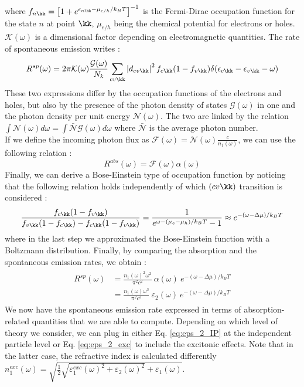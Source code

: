 where $f_{n\kk} = \left[ 1 + e^{\epsilon_{n\kk} - \mu_{e/h}/k_BT} \right]^{-1}$ is the Fermi-Dirac occupation function for the state $n$ at point $\kk$, $\mu_{e/h}$ being the chemical potential for electrons or holes. $\mathcal{K}(\omega)$ is a dimensional factor depending on electromagnetic quantities. The rate of spontaneous emission writes : 
\begin{equation}
	R^{sp}(\omega) = 2\pi \mathcal{K}(\omega) \frac{\mathcal{G} (\omega)}{N_k} \sum_{cv\kk} \left|d_{cv\kk} \right|^2 f_{c\kk}(1-f_{v\kk}) \delta(\epsilon_{c\kk} - \epsilon_{v\kk} - \omega)
\end{equation}
These two expressions differ by the occupation functions of the electrons and holes, but also by the presence of the photon density of states $\mathcal{G}(\omega)$ in one and the photon density per unit energy $\mathcal{N}(\omega)$. The two are linked by the relation $ \int\mathcal{N}(\omega) d\omega = \int \bar{\mathcal{N}} \mathcal{G}(\omega) d\omega$ where $\bar{\mathcal{N}}$ is the average photon number. \\
If we define the incoming photon flux as $\mathcal{F}(\omega) = \mathcal{N}(\omega) \frac{c}{n_1(\omega)}$, we can use the following relation :
\begin{equation}
	R^{abs}(\omega) = \mathcal{F}(\omega) \alpha(\omega)
\end{equation}
Finally, we can derive a Bose-Einstein type of occupation function by noticing that the following relation holds independently of which $(cv\kk)$ transition is considered :
\begin{equation}
	\frac{f_{c\kk} (1-f_{v\kk})}{f_{v\kk} (1-f_{c\kk}) - f_{c\kk}(1-f_{v\kk})} = \frac{1}{e^{\omega - (\mu_e - \mu_h)/k_BT} - 1 }\approx e^{-(\omega - \Delta \mu)/k_BT}
\end{equation}
where in the last step we approximated the Bose-Einstein function with a Boltzmann distribution.
Finally, by comparing the absorption and the spontaneous emission rates, we obtain :
\begin{align}
\begin{split}
	R^{sp}(\omega) &= \frac{n_1(\omega)^2\omega^2}{\pi^2 c^2}\ \alpha(\omega)\ e^{-(\omega - \Delta \mu)/k_BT} \\
	 &= \frac{n_1(\omega)\omega^3}{\pi^2 c^3}\ \varepsilon_2(\omega)\ e^{-(\omega - \Delta \mu)/k_BT} \label{eq:vRS_PL}
\end{split}
\end{align}
We now have the spontaneous emission rate expressed in terms of absorption-related quantities that we are able to compute. Depending on which level of theory we consider, we can plug in either Eq. \eqref{eq:eps_2_IP} at the independent particle level or Eq. \eqref{eq:eps_2_exc} to include the excitonic effects. Note that in the latter case, the refractive index is calculated differently $n_1^{exc}(\omega) = \sqrt{\tfrac{1}{2}\sqrt{\varepsilon_1^{exc}(\omega)^2+\varepsilon_2(\omega)^2} + \varepsilon_1(\omega)}$.

